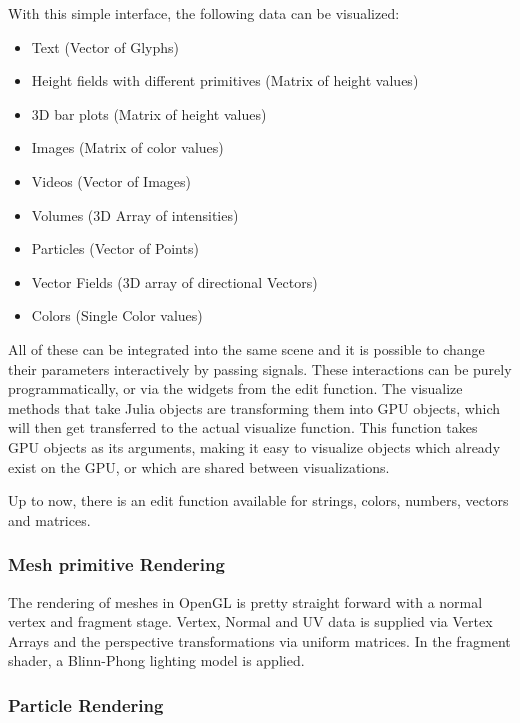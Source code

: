 With this simple interface, the following data can be visualized:

\begin{itemize}
    \item Text (Vector of Glyphs)
    \item Height fields with different primitives (Matrix of height values)
    \item 3D bar plots (Matrix of height values)
    \item Images (Matrix of color values)
    \item Videos (Vector of Images)
    \item Volumes (3D Array of intensities)
    \item Particles (Vector of Points)
    \item Vector Fields (3D array of directional Vectors)
    \item Colors (Single Color values)
\end{itemize}

All of these can be integrated into the same scene and it is possible to change their parameters interactively by passing signals.
These interactions can be purely programmatically, or via the widgets from the edit function.
The visualize methods that take Julia objects are transforming them into GPU objects, which will then get transferred to the actual visualize function. This function takes GPU objects as its arguments, making it easy to visualize objects which already exist on the GPU, or which are shared between visualizations.

Up to now, there is an edit function available for strings, colors, numbers, vectors and matrices.


\subsubsection{Mesh primitive Rendering}

The rendering of meshes in OpenGL is pretty straight forward with a normal vertex and fragment stage.
Vertex, Normal and UV data is supplied via Vertex Arrays and the perspective transformations via uniform matrices.
In the fragment shader, a Blinn-Phong lighting model is applied.

\subsubsection{Particle Rendering}

